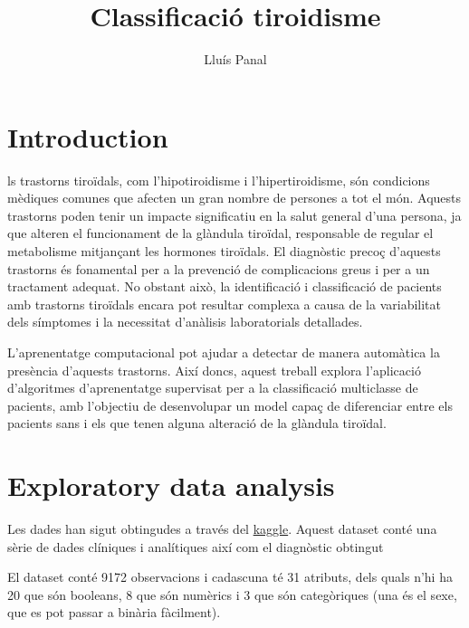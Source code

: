 \documentclass[9pt,a4paper,twoside]{tau-class/tau}
\title{Classificació tiroidisme}
\author[a,1]{Lluís Panal}
\affil[a]{1668072}
\begin{document}
    \maketitle 
    \thispagestyle{firststyle} \tauabstract 
    \tableofcontents
    \linenumbers 
    

\section{Introduction}

    ls trastorns tiroïdals, com l'hipotiroidisme i l'hipertiroidisme, són condicions mèdiques comunes que afecten un gran nombre de persones a tot el món. Aquests trastorns poden tenir un impacte significatiu en la salut general d'una persona, ja que alteren el funcionament de la glàndula tiroïdal, responsable de regular el metabolisme mitjançant les hormones tiroïdals. El diagnòstic precoç d'aquests trastorns és fonamental per a la prevenció de complicacions greus i per a un tractament adequat. No obstant això, la identificació i classificació de pacients amb trastorns tiroïdals encara pot resultar complexa a causa de la variabilitat dels símptomes i la necessitat d'anàlisis laboratorials detallades.

    L'aprenentatge computacional pot ajudar a detectar de manera automàtica la presència d'aquests trastorns. Així doncs, aquest treball explora l'aplicació d'algoritmes d'aprenentatge supervisat per a la classificació multiclasse de pacients, amb l'objectiu de desenvolupar un model capaç de diferenciar entre els pacients sans i els que tenen alguna alteració de la glàndula tiroïdal.

\section{Exploratory data analysis}
    Les dades han sigut obtingudes a través del \href{https://www.kaggle.com/datasets/emmanuelfwerr/thyroid-disease-data/data}{kaggle}. Aquest dataset conté una sèrie de dades clíniques i analítiques així com el diagnòstic obtingut

    El dataset conté 9172 observacions i cadascuna té 31 atributs, dels quals n'hi ha 20 que són booleans, 8 que són numèrics i 3 que són categòriques (una és el sexe, que es pot passar a binària fàcilment). 
    
\end{document}
